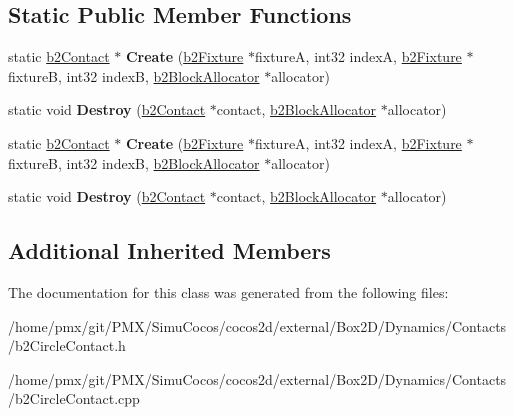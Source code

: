 \subsection*{Static Public Member Functions}
\begin{DoxyCompactItemize}
\item 
\mbox{\label{classb2CircleContact_ab0ea452487cb19217ae8480dbc22fd41}} 
static \hyperlink{classb2Contact}{b2\+Contact} $\ast$ {\bfseries Create} (\hyperlink{classb2Fixture}{b2\+Fixture} $\ast$fixtureA, int32 indexA, \hyperlink{classb2Fixture}{b2\+Fixture} $\ast$fixtureB, int32 indexB, \hyperlink{classb2BlockAllocator}{b2\+Block\+Allocator} $\ast$allocator)
\item 
\mbox{\label{classb2CircleContact_a4ca67c653a18d88180e49149f0df742a}} 
static void {\bfseries Destroy} (\hyperlink{classb2Contact}{b2\+Contact} $\ast$contact, \hyperlink{classb2BlockAllocator}{b2\+Block\+Allocator} $\ast$allocator)
\item 
\mbox{\label{classb2CircleContact_a741c07fe3f626b80e01ff3d96cf2d90a}} 
static \hyperlink{classb2Contact}{b2\+Contact} $\ast$ {\bfseries Create} (\hyperlink{classb2Fixture}{b2\+Fixture} $\ast$fixtureA, int32 indexA, \hyperlink{classb2Fixture}{b2\+Fixture} $\ast$fixtureB, int32 indexB, \hyperlink{classb2BlockAllocator}{b2\+Block\+Allocator} $\ast$allocator)
\item 
\mbox{\label{classb2CircleContact_a0171e991d568b7f4d8e5b4179072bf60}} 
static void {\bfseries Destroy} (\hyperlink{classb2Contact}{b2\+Contact} $\ast$contact, \hyperlink{classb2BlockAllocator}{b2\+Block\+Allocator} $\ast$allocator)
\end{DoxyCompactItemize}
\subsection*{Additional Inherited Members}


The documentation for this class was generated from the following files\+:\begin{DoxyCompactItemize}
\item 
/home/pmx/git/\+P\+M\+X/\+Simu\+Cocos/cocos2d/external/\+Box2\+D/\+Dynamics/\+Contacts/b2\+Circle\+Contact.\+h\item 
/home/pmx/git/\+P\+M\+X/\+Simu\+Cocos/cocos2d/external/\+Box2\+D/\+Dynamics/\+Contacts/b2\+Circle\+Contact.\+cpp\end{DoxyCompactItemize}
